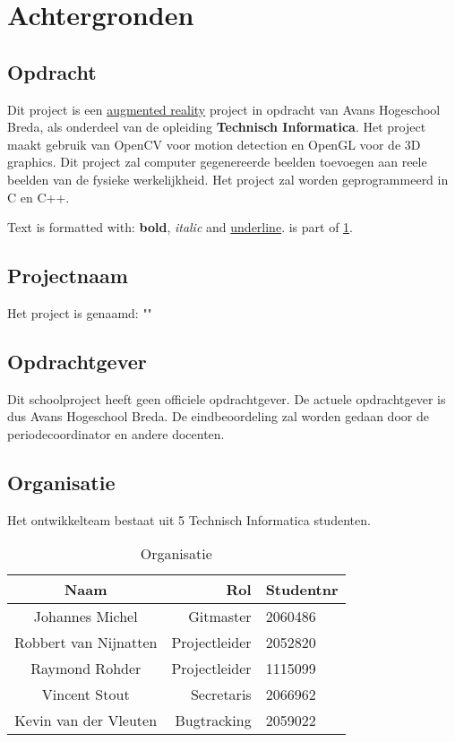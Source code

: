 
\chapter{Achtergronden} \label{cha:your-first-document}

\section{Opdracht} \label{sec:opdracht}

Dit project is een \underline{augmented reality} project in opdracht van Avans Hogeschool Breda, als onderdeel van de opleiding \textbf{Technisch Informatica}. Het project maakt gebruik van OpenCV voor motion detection en OpenGL voor de 3D graphics. Dit project zal computer gegenereerde beelden toevoegen aan reele beelden van de fysieke werkelijkheid. Het project zal worden geprogrammeerd in C en C++.

Text is formatted with: \textbf{bold}, \textit{italic} and \underline{underline}.
 is part of \cref{cha:your-first-document}.

\section{Projectnaam} \label{sec:projectnaam}
Het project is genaamd: "\projectname"

\section{Opdrachtgever} \label{sec:opdrachtgever}
Dit schoolproject heeft geen officiele opdrachtgever. De actuele opdrachtgever is dus Avans Hogeschool Breda. De eindbeoordeling zal worden gedaan door de periodecoordinator en andere docenten.

\section{Organisatie} \label{sec:organisatie}
Het ontwikkelteam bestaat uit 5 Technisch Informatica studenten.
\begin{table}[h]
  \centering
  \caption{Organisatie}
  \label{tb:table}
  \begin{tabular}{crl}
    \toprule
    Naam     		& Rol			& Studentnr\\
    \midrule
    Johannes Michel	& Gitmaster		& 2060486\\
    Robbert van Nijnatten	& Projectleider	& 2052820\\
    Raymond Rohder	& Projectleider	& 1115099\\
    Vincent Stout	& Secretaris	& 2066962\\
    Kevin van der Vleuten	& Bugtracking	& 2059022\\
    \bottomrule
  \end{tabular}
\end{table}

